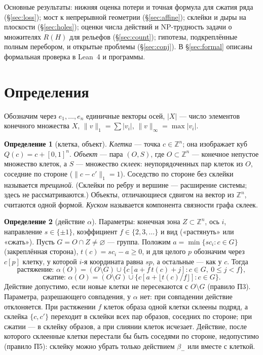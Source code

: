 \documentclass[11pt,a4paper]{article}
\theoremstyle{plain}
\theoremstyle{definition}
\newtheorem{definition}{Определение}
\theoremstyle{remark}
\newcommand{\Z}{\mathbb{Z}}
\begin{document}
Основные результаты: нижняя оценка потери и точная формула для сжатия ряда (§\ref{sec:loss}); мост к непрерывной геометрии (§\ref{sec:affine}); склейки и дыры на плоскости (§\ref{sec:holes}); оценки числа действий и NP-трудность задачи о множителях $R(H)$ для рельефов (§\ref{sec:count}); гипотезы, подкреплённые полным перебором, и открытые проблемы (§\ref{sec:conj}). В §\ref{sec:formal} описаны формальная проверка в Lean~4 и программы.

\section{Определения}\label{sec:def}

Обозначим через $e_1,\dots,e_n$ единичные векторы осей, $|X|$ — число элементов конечного множества $X$, $\|v\|_1=\sum|v_i|$, $\|v\|_\infty=\max|v_i|$.

\begin{definition}[клетка, объект]
\emph{Клетка} — точка $c\in\Z^n$; она изображает куб $Q(c)=c+[0,1]^n$. \emph{Объект} — пара $(O,S)$, где $O\subset\Z^n$ — конечное непустое множество клеток, а $S$ — множество \emph{склеек}: неупорядоченных пар клеток из $O$, соседние по стороне ($\|c-c'\|_1=1$). Соседство по стороне без склейки называется \emph{трещиной}. (Склейки по ребру и вершине — расширение системы; здесь не рассматриваются.) Объекты, отличающиеся сдвигом на вектор из $\Z^n$, считаются одной формой. \emph{Куском} называется компонента связности графа склеек.
\end{definition}

\begin{definition}[действие $\alpha$]
Параметры: конечная зона $Z\subset\Z^n$, ось $i$, направление $s\in\{\pm1\}$, коэффициент $f\in\{2,3,\dots\}$ и вид («растянуть» или «сжать»). Пусть $G=O\cap Z\neq\varnothing$ — группа. Положим $a=\min\{s c_i: c\in G\}$ (закреплённая сторона), $t(c)=s c_i-a\ge0$, и для целого $p$ обозначим через $c[p]$ клетку, у которой $i$-я координата равна $sp$, а остальные — как у $c$. Тогда
\[
\text{растяжение: } \alpha(O)=(O\setminus G)\cup\{c[a+f\,t(c)+j]: c\in G,\ 0\le j<f\},
\]
\[
\text{сжатие: } \alpha(O)=(O\setminus G)\cup\{c[a+\lfloor t(c)/f\rfloor]: c\in G\}.
\]
Действие допустимо, если новые клетки не пересекаются с $O\setminus G$ (правило П3). Параметра, разрешающего совпадения, у $\alpha$ нет: при совпадении действие отклоняется. При растяжении $f$ клеток образа одной клетки склеены подряд, а склейка $\{c,c'\}$ переходит в склейки всех пар образов, соседних по стороне; при сжатии — в склейку образов, а при слиянии клеток исчезает. Действие, после которого склеенные клетки перестали бы быть соседями по стороне, недопустимо (правило П5): склейку можно убрать только действием $\beta_-$ или вместе с клеткой.
\end{definition}
\end{document}

